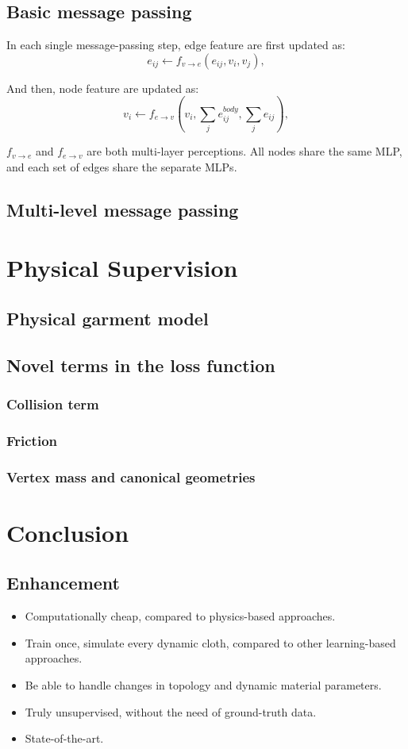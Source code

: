 \documentclass{article}
\begin{document}
\subsection{Basic message passing}
\par In each single message-passing step, edge feature are first updated as:
$$
e_{ij} \gets f_{v \rightarrow e}(e_{ij},v_{i},v_{j}) ,
$$
\par And then, node feature are updated as:
$$
v_i \gets f_{e \rightarrow v}(v_i,\sum_{j}e_{ij}^{body},\sum_{j}e_{ij}) , 
$$
\par $f_{v \rightarrow e}$ and $f_{e \rightarrow v}$ are both multi-layer perceptions. All nodes share the same MLP, and each set of edges share the separate MLPs.
\par 
\subsection{Multi-level message passing}

\section{Physical Supervision}
\subsection{Physical garment model}
\subsection{Novel terms in the loss function}
\subsubsection{Collision term}
\subsubsection{Friction}
\subsubsection{Vertex mass and canonical geometries}
\section{Conclusion}
\subsection{Enhancement}
\begin{itemize}
    \item Computationally cheap, compared to physics-based approaches.
    \item Train once, simulate every dynamic cloth, compared to other learning-based approaches.
    \item Be able to handle changes in topology and dynamic material parameters.
    \item Truly unsupervised, without the need of ground-truth data.
    \item State-of-the-art.
\end{itemize}
\end{document}
